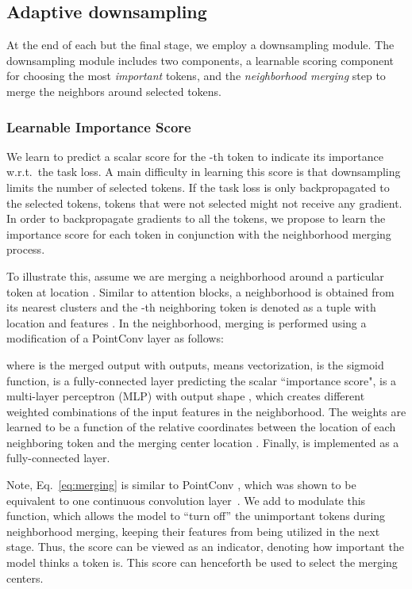 \documentclass[10pt,twocolumn,letterpaper]{article}
\begin{document}
\subsection{Adaptive downsampling}\label{sec:adads}

At the end of each but the final stage, we employ a downsampling module. The downsampling module includes two components, a learnable scoring component for choosing the most \textit{important} tokens, and the \textit{neighborhood merging} step to merge the neighbors around selected tokens. 



\subsubsection{Learnable Importance Score}
We learn to predict a scalar score  for the -th token to indicate its importance w.r.t.\ the task loss. A main difficulty in learning this score is that downsampling limits the number of selected tokens. If the task loss is only backpropagated to the selected tokens, tokens that were not selected might not receive any gradient. 
In order to backpropagate gradients to all the tokens, we propose to learn the importance score for each token in conjunction with the neighborhood merging process.

To illustrate this, assume we are merging a neighborhood around a particular token at location . Similar to attention blocks, a neighborhood  is obtained from its nearest  clusters and the -th neighboring token is denoted as a tuple  with location  and features . 
In the neighborhood, merging is performed using a modification of a PointConv layer\cite{pointconv} as follows:  \vspace{-0.4cm}

where  is the merged output with  outputs,  means vectorization,  is the sigmoid function,  is a fully-connected layer predicting the scalar ``importance score",  is a multi-layer perceptron (MLP) with output shape , which creates different weighted combinations of the input features  in the neighborhood. The weights are learned to be a function of the relative coordinates between the location of each neighboring token and the merging center location . Finally,  is implemented as a fully-connected layer. 

Note, Eq.~\eqref{eq:merging} is similar to PointConv , which was shown to be equivalent to one continuous convolution layer~\cite{pointconv}. We add  to modulate this function, which allows the model 
to ``turn off'' the unimportant tokens during neighborhood merging, keeping their features from being utilized in the next stage. Thus, the score  can be viewed as an indicator, denoting how important the model thinks a token is. This score can henceforth be used to select the merging centers. 
\end{document}
